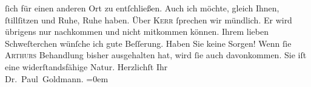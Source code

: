 \begin{ledgroupsized}[t]{13cm}
                   ſich für einen anderen Ort zu
               entſchließen. Auch ich möchte, gleich Ihnen, ſtillſitzen und Ruhe, Ruhe haben. Über
                  \textsc{Kerr} ſprechen wir mündlich. Er wird übrigens nur nachkommen und nicht mitkommen
               können. Ihrem lieben Schweſterchen wünſche ich gute Beſſerung. Haben Sie keine Sorgen! Wenn ſie
                  \textsc{Arthurs} Behandlung bisher ausgehalten hat, wird ſie auch
               davonkommen. Sie iſt eine widerſtandsfähige Natur.\pend
           \pstart
           Herzlichſt Ihr {\\[\baselineskip]}\spacefill\mbox{Dr. Paul Goldmann.}\pend
           \leftskip=0em{}
         
         \endnumbering{}\end{ledgroupsized}  \newcommand{\dateiname}{L03072}\newcommand{\titel}{Paul Goldmann an Arthur Schnitzler und Olga Gussmann, 7. 7. [1901]}\newcommand{\editorInnen}{Martin Anton Müller und Laura Untner}
      